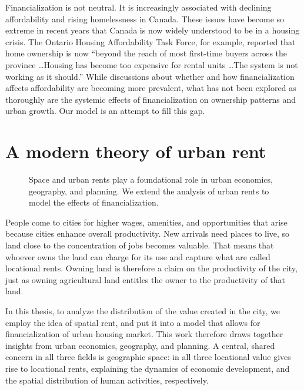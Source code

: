 Financialization is not neutral. It is increasingly associated with declining affordability and rising homelessness in Canada. These issues have become so extreme in recent years that Canada is now widely understood to be in a housing crisis. The Ontario Housing Affordability Task Force, for example, reported that home ownership is now ``beyond the reach of most first-time buyers across the province \dots Housing has become too expensive for rental units \dots The system is not working as it should.'' While discussions about whether and how financialization affects affordability are becoming more prevalent, what has not been explored as thoroughly are the systemic effects of financialization on ownership patterns and urban growth. Our model is an attempt to fill this gap.%

\section{A modern theory of urban rent}
\begin{figure}[!ht]
\centering

\caption[Linking space and urban rents to the effects of financialization.]{Space and urban rents play a foundational role in urban economics, geography, and planning. We extend the analysis of urban rents to model the effects of financialization.}
\label{fig-fields}
\end{figure}

People come to cities for higher wages, amenities, and opportunities that arise because cities enhance overall productivity. New arrivals need places to live, so land close to the concentration of jobs becomes valuable. That means that whoever owns the land can charge for its use and capture what are called \glspl{locational rent}. Owning land is therefore a claim on the productivity of the city, just as owning agricultural land entitles the owner to the productivity of that land. %

In this thesis, to analyze the distribution of the value created in the city, we employ the idea of spatial rent, and put it into a model that allows for financialization of urban housing market. This work therefore draws together insights from urban economics, geography, and planning. A central, shared concern in all three fields is geographic space: in all three locational value gives rise to locational rents,  explaining the dynamics of economic development, and the spatial distribution of human activities,  respectively. 

